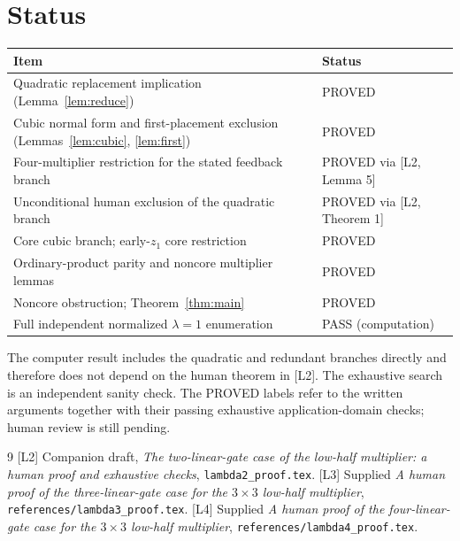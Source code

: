 \documentclass[11pt,a4paper]{article}
\begin{document}
\section{Status}
\begin{center}\begin{tabularx}{\textwidth}{@{}X l@{}}\toprule
Item & Status\\\midrule
Quadratic replacement implication (Lemma~\ref{lem:reduce}) & PROVED\\
Cubic normal form and first-placement exclusion (Lemmas~\ref{lem:cubic}, \ref{lem:first}) & PROVED\\
Four-multiplier restriction for the stated feedback branch & PROVED via [L2, Lemma 5]\\
Unconditional human exclusion of the quadratic branch & PROVED via [L2, Theorem 1]\\
Core cubic branch; early-$z_1$ core restriction & PROVED\\
Ordinary-product parity and noncore multiplier lemmas & PROVED\\
Noncore obstruction; Theorem~\ref{thm:main} & PROVED\\
Full independent normalized $\lambda=1$ enumeration & PASS (computation)\\\bottomrule
\end{tabularx}\end{center}
The computer result includes the quadratic and redundant branches directly and therefore does not depend on the human theorem in [L2]. The exhaustive search is an independent sanity check. The PROVED labels refer to the written arguments together with their passing exhaustive application-domain checks; human review is still pending.

\begin{thebibliography}{9}
 [L2] Companion draft, \emph{The two-linear-gate case of the low-half multiplier: a human proof and exhaustive checks}, \texttt{lambda2\_proof.tex}.
 [L3] Supplied \emph{A human proof of the three-linear-gate case for the $3\times3$ low-half multiplier}, \texttt{references/lambda3\_proof.tex}.
 [L4] Supplied \emph{A human proof of the four-linear-gate case for the $3\times3$ low-half multiplier}, \texttt{references/lambda4\_proof.tex}.
\end{thebibliography}
\end{document}

